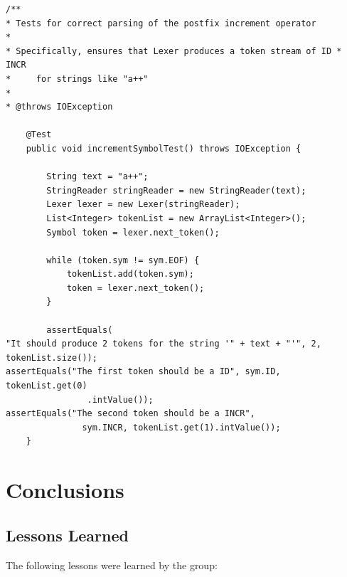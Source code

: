 \documentclass{book}
\begin{document}
\begin{verbatim}
/**
* Tests for correct parsing of the postfix increment operator
* 
* Specifically, ensures that Lexer produces a token stream of ID * INCR 
*     for strings like "a++"
* 
* @throws IOException

	@Test
	public void incrementSymbolTest() throws IOException {

		String text = "a++";
		StringReader stringReader = new StringReader(text);
		Lexer lexer = new Lexer(stringReader);
		List<Integer> tokenList = new ArrayList<Integer>();
		Symbol token = lexer.next_token();

		while (token.sym != sym.EOF) {
			tokenList.add(token.sym);
			token = lexer.next_token();
		}

		assertEquals(
"It should produce 2 tokens for the string '" + text + "'", 2, tokenList.size());
assertEquals("The first token should be a ID", sym.ID, tokenList.get(0)
				.intValue());
assertEquals("The second token should be a INCR", 
               sym.INCR, tokenList.get(1).intValue());
	}
\end{verbatim}

\chapter{Conclusions}
\label{chap:concl}

\section{Lessons Learned}
\label{sec:lessons}

The following lessons were learned by the group:
\end{document}
